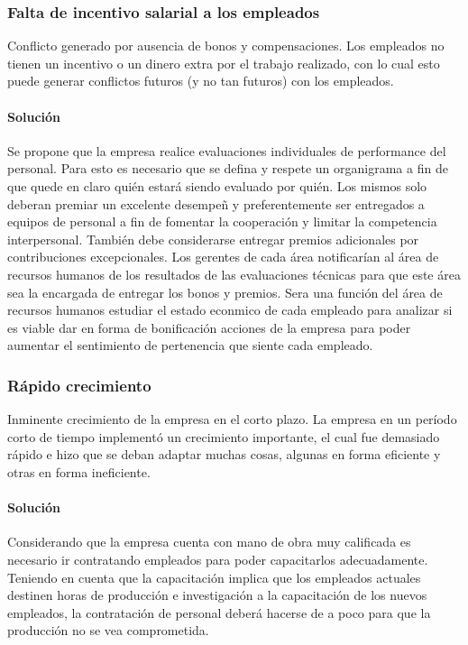 		\subsubsection{Falta de incentivo salarial a los empleados}
			Conflicto generado por ausencia de bonos y compensaciones. Los empleados no tienen un incentivo o un dinero extra por el trabajo realizado, con lo cual esto puede generar conflictos futuros (y no tan futuros) con los empleados.
		\paragraph{Soluci\'on}
			Se propone que la empresa realice evaluaciones individuales de performance del personal. 
			Para esto es necesario que se defina y respete un organigrama a fin de que quede en claro qui\'{e}n estar\'{a} siendo evaluado por qui\'{e}n. 
			Los mismos solo deberan premiar un excelente desempe\~{n} y preferentemente ser entregados a equipos de personal a fin de fomentar la cooperaci\'{o}n y limitar la competencia interpersonal. 
			Tambi\'{e}n debe considerarse entregar premios adicionales por contribuciones excepcionales.
			Los gerentes de cada \'{a}rea notificar\'{i}an al \'{a}rea de recursos humanos de los resultados de las evaluaciones t\'{e}cnicas para que este \'{a}rea sea la encargada de entregar los bonos y premios.
			Sera una funci\'{o}n del \'{a}rea de recursos humanos estudiar el estado econmico de cada empleado para analizar si es viable dar en forma de bonificaci\'{o}n acciones de la empresa para poder aumentar el sentimiento de pertenencia que siente cada empleado.


		\subsubsection{R\'apido crecimiento}
			Inminente crecimiento de la empresa en el corto plazo. La empresa en un per\'iodo corto de tiempo implement\'o un crecimiento importante, el 				cual fue demasiado r\'apido e hizo que se deban adaptar muchas cosas, algunas en forma eficiente y otras en forma ineficiente.
		\paragraph{Soluci\'on}
			Considerando que la empresa cuenta con mano de obra muy calificada es necesario ir contratando empleados para poder capacitarlos adecuadamente. 
			Teniendo en cuenta que la capacitaci\'{o}n implica que los empleados actuales destinen horas de producci\'{o}n e investigaci\'{o}n a la capacitaci\'{o}n de los nuevos empleados, la contrataci\'{o}n de personal deber\'{a} hacerse de a poco para que la producci\'{o}n no se vea comprometida.